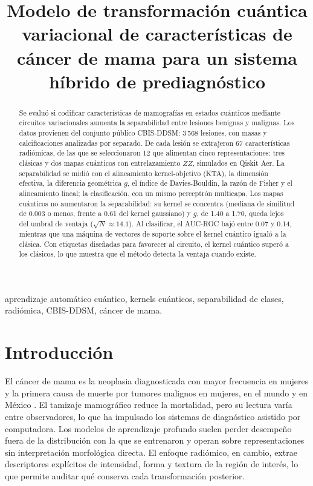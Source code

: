 \documentclass[conference,letterpaper]{IEEEtran}
\title{\fontsize{18}{22}\selectfont Modelo de transformación cuántica variacional de características de cáncer de mama para un sistema híbrido de prediagnóstico}
\author{\IEEEauthorblockN{Miguel Alexander Sánchez García$^{1}$, Jesús Yaljá Montiel Pérez, Ana María Winfield Reyes}
\IEEEauthorblockA{Escuela Superior de Cómputo, Instituto Politécnico Nacional, Ciudad de México\\
Tel. 57-29-6000 ext. 52000 y 52021. E-mail: $^{1}$msanchezg1904@alumno.ipn.mx}%
}
\begin{document}
\maketitle

\begin{abstract}
Se evaluó si codificar características de mamografías en estados cuánticos mediante circuitos variacionales aumenta la separabilidad entre lesiones benignas y malignas. Los datos provienen del conjunto público CBIS-DDSM: 3\,568 lesiones, con masas y calcificaciones analizadas por separado. De cada lesión se extrajeron 67 características radiómicas, de las que se seleccionaron 12 que alimentan cinco representaciones: tres clásicas y dos mapas cuánticos con entrelazamiento $ZZ$, simulados en Qiskit Aer. La separabilidad se midió con el alineamiento kernel-objetivo (KTA), la dimensión efectiva, la diferencia geométrica $g$, el índice de Davies-Bouldin, la razón de Fisher y el alineamiento lineal; la clasificación, con un mismo perceptrón multicapa. Los mapas cuánticos no aumentaron la separabilidad: su kernel se concentra (mediana de similitud de 0.003 o menos, frente a 0.61 del kernel gaussiano) y $g$, de 1.40 a 1.70, queda lejos del umbral de ventaja ($\sqrt{N} \approx 14.1$). Al clasificar, el AUC-ROC bajó entre 0.07 y 0.14, mientras que una máquina de vectores de soporte sobre el kernel cuántico igualó a la clásica. Con etiquetas diseñadas para favorecer al circuito, el kernel cuántico superó a los clásicos, lo que muestra que el método detecta la ventaja cuando existe.
\end{abstract}

\begin{IEEEkeywords}
aprendizaje automático cuántico, kernels cuánticos, separabilidad de clases, radiómica, CBIS-DDSM, cáncer de mama.
\end{IEEEkeywords}

\section{Introducción}

El cáncer de mama es la neoplasia diagnosticada con mayor frecuencia en mujeres y la primera causa de muerte por tumores malignos en mujeres, en el mundo y en México \cite{Bray2024GLOBOCAN, INEGI2025}. El tamizaje mamográfico reduce la mortalidad, pero su lectura varía entre observadores, lo que ha impulsado los sistemas de diagnóstico asistido por computadora. Los modelos de aprendizaje profundo suelen perder desempeño fuera de la distribución con la que se entrenaron \cite{Wang2020DeepLearning} y operan sobre representaciones sin interpretación morfológica directa. El enfoque radiómico, en cambio, extrae descriptores explícitos de intensidad, forma y textura de la región de interés, lo que permite auditar qué conserva cada transformación posterior.
\end{document}
